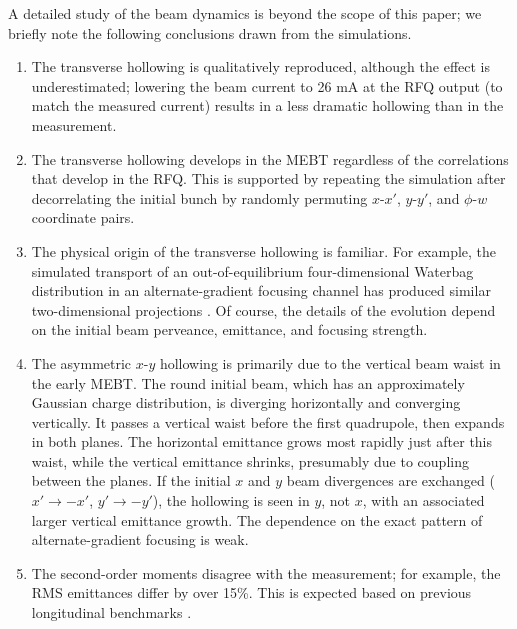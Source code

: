 \documentclass[%
 reprint,
 amsmath,amssymb,
 aps,
prstab,
]{revtex4-2}
\begin{document}
A detailed study of the beam dynamics is beyond the scope of this paper; we briefly note the following conclusions drawn from the simulations.
%
\begin{enumerate}
    
    \item The transverse hollowing is qualitatively reproduced, although the effect is underestimated; lowering the beam current to 26 mA at the RFQ output (to match the measured current) results in a less dramatic hollowing than in the measurement. 
    
    \item The transverse hollowing develops in the MEBT regardless of the correlations that develop in the RFQ. This is supported by repeating the simulation after decorrelating the initial bunch by randomly permuting $x$-$x'$, $y$-$y'$, and $\phi$-$w$ coordinate pairs.
    
    \item The physical origin of the transverse hollowing is familiar. For example, the simulated transport of an out-of-equilibrium four-dimensional Waterbag distribution in an alternate-gradient focusing channel has produced similar two-dimensional projections \cite{Lund2009}. Of course, the details of the evolution depend on the initial beam perveance, emittance, and focusing strength.
    
    \item The asymmetric $x$-$y$ hollowing is primarily due to the vertical beam waist in the early MEBT. The round initial beam, which has an approximately Gaussian charge distribution, is diverging horizontally and converging vertically. It passes a vertical waist before the first quadrupole, then expands in both planes. The horizontal emittance grows most rapidly just after this waist, while the vertical emittance shrinks, presumably due to coupling between the planes. If the initial $x$ and $y$ beam divergences are exchanged ($x' \rightarrow -x'$, $y' \rightarrow -y'$), the hollowing is seen in $y$, not $x$, with an associated larger vertical emittance growth. The dependence on the exact pattern of alternate-gradient focusing is weak.
    
    \item The second-order moments disagree with the measurement; for example, the RMS emittances differ by over 15\%. This is expected based on previous longitudinal benchmarks \cite{Ruisard2020}.

\end{enumerate}
\end{document}
